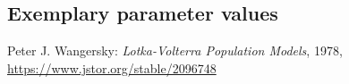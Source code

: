 \documentclass[10pt,a4paper]{article}
\begin{document}
	
	
	
	\subsection{Exemplary parameter values}
	

	
	
	
	
	\begin{thebibliography}{10}		
		 Peter J. Wangersky: 
		\textit{Lotka-Volterra Population Models}, 1978, \href{https://www.jstor.org/stable/2096748}{https://www.jstor.org/stable/2096748}
	\end{thebibliography}
\end{document}
